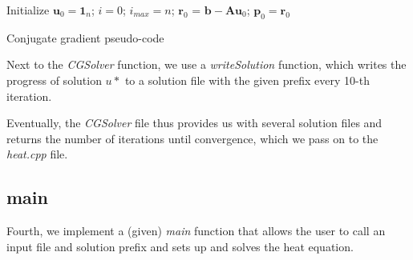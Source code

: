 \documentclass[12pt, a4paper]{article}
\begin{document}
\begin{algorithm}[h]
    \setcounter{AlgoLine}{0}
    
    
    Initialize $\mathbf{u}_0 = \mathbf{1}_n$; $i = 0$;
    $i_{max} = n$; $\mathbf{r}_0$ = $\mathbf{b} - 
    \mathbf{A}\mathbf{u}_0$; $\mathbf{p}_0 = \mathbf{r}_0$
    
    
    \caption{Conjugate gradient pseudo-code}
    \label{alg:CGSolver}
    \end{algorithm}

Next to the \textit{CGSolver} function, we use a \textit{writeSolution} 
function, which writes the progress of solution $u*$ to a solution file with
the given prefix every 10-th iteration.

Eventually, the \textit{CGSolver} file thus provides us with several solution 
files and returns the number of iterations until convergence, which we pass on 
to the \textit{heat.cpp} file.

\subsection{main}
Fourth, we implement a (given) \textit{main} function that allows the user to
call an input file and solution prefix and sets up and solves the heat equation.
\end{document}
